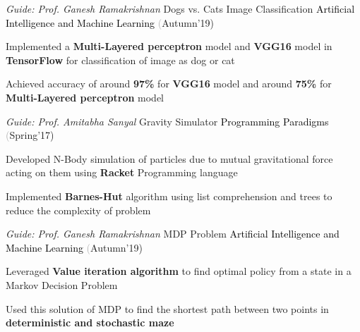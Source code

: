 \begin{cventries}
  \cventry
    {\textit{Guide: Prof. Ganesh Ramakrishnan}}
    {Dogs vs. Cats Image Classification}
    {\textcolor{black} {Artificial Intelligence and Machine Learning}}
    {\fontsize{9pt}{1em} \textcolor{darkgray}(Autumn'19)}
    {
      \begin{cvitems}
        \item Implemented a \textbf{Multi-Layered perceptron} model and \textbf{VGG16} model in \textbf{TensorFlow} for classification of image as dog or cat \vspace{0.3mm}
        \item Achieved accuracy of around \textbf{97\%} for \textbf{VGG16} model and around \textbf{75\%} for \textbf{Multi-Layered perceptron} model 
      \end{cvitems}
    }
  \cventry
    {\textit{Guide: Prof. Amitabha Sanyal}}
    {Gravity Simulator}
    {\textcolor{black} {Programming Paradigms}}
    {\fontsize{9pt}{1em} \textcolor{darkgray}(Spring'17)}
    {
      \begin{cvitems}
        \item Developed N-Body simulation of particles due to mutual gravitational force acting on them using \textbf{Racket} Programming language\vspace{0.3mm}
        \item Implemented \textbf{Barnes-Hut} algorithm using list comprehension and trees to reduce the complexity of problem
      \end{cvitems}
    }
  \cventry
    {\textit{Guide: Prof. Ganesh Ramakrishnan}}
    {MDP Problem}
    {\textcolor{black} {Artificial Intelligence and Machine Learning}}
    {\fontsize{9pt}{1em} \textcolor{darkgray}(Autumn'19)}
    {
      \begin{cvitems}
        \item Leveraged \textbf{Value iteration algorithm} to find optimal policy from a state in a Markov Decision Problem\vspace{0.3mm}
        \item Used this solution of MDP to find the shortest path between two points in \textbf{deterministic and stochastic maze}
      \end{cvitems}
    }
\end{cventries}

